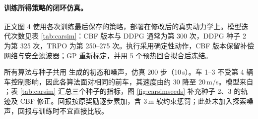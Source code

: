 \documentclass[UTF8,a4paper,zihao=-4,fontset=fandol]{ctexart}
\begin{document}
\paragraph{训练所得策略的闭环仿真。}
正文图 4 使用各次训练最后保存的策略，部署在修改后的真实动力学上。模型迭代次数见表 \ref{tab:carsim}：CBF 版本与 DDPG 通常为第 300 次，DDPG 种子 2 为第 325 次，TRPO 为第 250–275 次。执行采用确定性动作，CBF 版本保留补偿网络与安全滤波器；GP 重新标定，并用 5 个预热回合拟合后冻结。

所有算法与种子共用  生成的初态和噪声，仿真 200 步（10\,s）。车 1–3 不受第 4 辆车控制影响，因此各算法面对相同的前车，其速度由约 30 降至 20\,m/s。模型来自 ；表 \ref{tab:carsim} 汇总三个种子的指标，图 \ref{fig:carsimseeds} 补充种子 2、3 的轨迹及 CBF 修正。回报按原奖励逐步累加，含 3\,m 软约束惩罚；此处未加入探索噪声，回报与训练时不宜直接比较。
\end{document}
